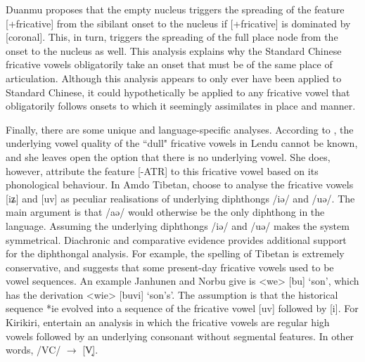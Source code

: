 \documentclass[output=paper,colorlinks,citecolor=brown,chinesefont]{langscibook}
\begin{document}
Duanmu proposes that the empty nucleus triggers the spreading of the feature [+fricative] from the sibilant onset to the nucleus if [+fricative] is dominated by [coronal]. This, in turn, triggers the spreading of the full place node from the onset to the nucleus as well. This analysis explains why the Standard Chinese fricative vowels obligatorily take an onset that must be of the same place of articulation. Although this analysis appears to only ever have been applied to Standard Chinese, it could hypothetically be applied to any fricative vowel that obligatorily follows onsets to which it seemingly assimilates in place and manner.

Finally, there are some unique and language-specific analyses. According to \citet{Kutsch_Lojenga_1989}, the underlying vowel quality of the ``dull" fricative vowels in Lendu cannot be known, and she leaves open the option that there is no underlying vowel. She does, however, attribute the feature [-ATR] to this fricative vowel based on its phonological behaviour. In Amdo Tibetan, \citet{Janhunen&Norbu_2014} choose to analyse the fricative vowels [iʑ] and [uv] as peculiar realisations of underlying diphthongs /iə/ and /uə/. The main argument is that /aə/ would otherwise be the only diphthong in the language. Assuming  the underlying diphthongs /iə/ and /uə/ makes the system symmetrical. Diachronic and comparative evidence provides additional support for the diphthongal analysis. For example, the spelling of Tibetan is extremely conservative, and suggests that some present-day fricative vowels used to be vowel sequences. An example Janhunen and Norbu give is <we> [bu] `son', which has the derivation <wie> [buvi] `son's'. The assumption is that the historical sequence *ie evolved into a sequence of the fricative vowel [uv] followed by [i]. For Kirikiri, \citet{clouse&clouse_1993} entertain an analysis in which the fricative vowels are regular high vowels followed by an underlying consonant without segmental features. In other words, /VC/ $\rightarrow$ [V̝].
\end{document}
